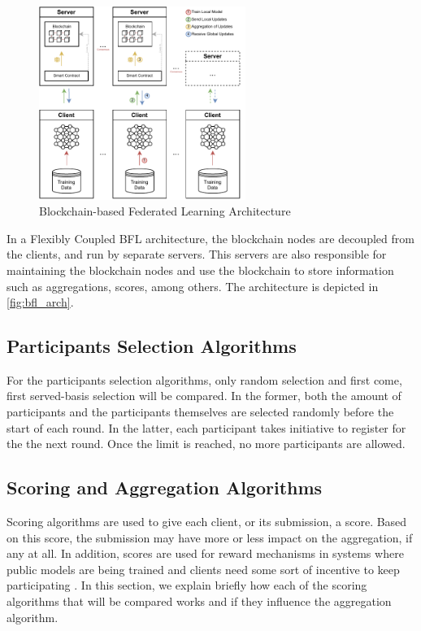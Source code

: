 \begin{figure}[!ht]
    \centering
    \centering
    \includegraphics[width=0.6\textwidth]{graphics/bfl-architecture.pdf}
    \caption{Blockchain-based Federated Learning Architecture}
    \label{fig:bfl_arch}
\end{figure}

In a Flexibly Coupled BFL architecture, the blockchain nodes are decoupled from the clients, and run by separate servers. This servers are also responsible for maintaining the blockchain nodes and use the blockchain to store information such as aggregations, scores, among others. The architecture is depicted in \autoref{fig:bfl_arch}.

\subsection{Participants Selection Algorithms}

For the participants selection algorithms, only random selection and first come, first served-basis selection will be compared. In the former, both the amount of participants and the participants themselves are selected randomly before the start of each round. In the latter, each participant takes initiative to register for the the next round. Once the limit is reached, no more participants are allowed.

\subsection{Scoring and Aggregation Algorithms}
\label{background:scoring}

Scoring algorithms are used to give each client, or its submission, a score. Based on this score, the submission may have more or less impact on the aggregation, if any at all. In addition, scores are used for reward mechanisms in systems where public models are being trained and clients need some sort of incentive to keep participating \cite{8945913, 8832210, 8905038, 9006344}. In this section, we explain briefly how each of the scoring algorithms that will be compared works and if they influence the aggregation algorithm.

